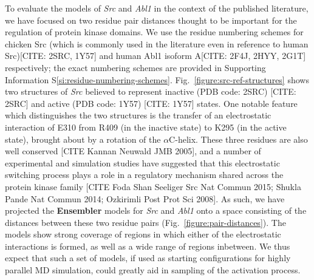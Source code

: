 \documentclass[aps,pre,twocolumn,nofootinbib,superscriptaddress,linenumbers]{revtex4-1}
\begin{document}
To evaluate the models of \emph{Src} and \emph{Abl1} in the context of the published literature, we have focused on two residue pair distances thought to be important for the regulation of protein kinase domains.
We use the residue numbering schemes for chicken Src (which is commonly used in the literature even in reference to human Src)[CITE: 2SRC, 1Y57] and human Abl1 isoform A[CITE: 2F4J, 2HYY, 2G1T] respectively; the exact numbering schemes are provided in Supporting Information S\ref{si:residue-numbering-schemes}.
Fig.~\ref{figure:src-ref-structures} shows two structures of \emph{Src} believed to represent inactive (PDB code: 2SRC) {\color{red}[CITE: 2SRC]} and active (PDB code: 1Y57) {\color{red}[CITE: 1Y57]} states.
One notable feature which distinguishes the two structures is the transfer of an electrostatic interaction of E310 from R409 (in the inactive state) to K295 (in the active state), brought about by a rotation of the $\alpha$C-helix.
These three residues are also well conserved [CITE Kannan Neuwald JMB 2005], and a number of experimental and simulation studies have suggested that this electrostatic switching process plays a role in a regulatory mechanism shared across the protein kinase family [CITE Foda Shan Seeliger Src Nat Commun 2015; Shukla Pande Nat Commun 2014; Ozkirimli Post Prot Sci 2008].
As such, we have projected the {\bf Ensembler} models for \emph{Src} and \emph{Abl1} onto a space consisting of the distances between these two residue pairs (Fig.~\ref{figure:pair-distances}).
The models show strong coverage of regions in which either of the electrostatic interactions is formed, as well as a wide range of regions inbetween.
We thus expect that such a set of models, if used as starting configurations for highly parallel MD simulation, could greatly aid in sampling of the activation process.

\end{document}
